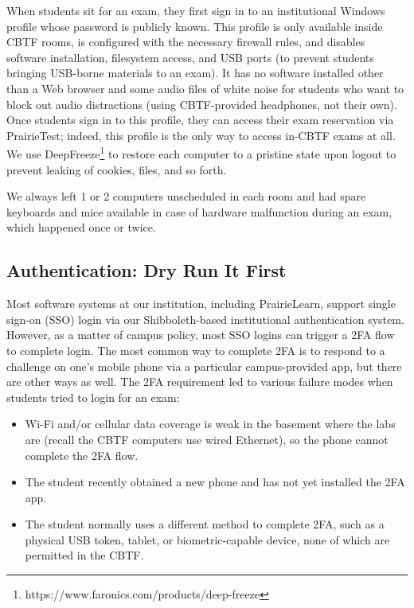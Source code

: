 When students sit for an exam, they first sign in to
an institutional Windows profile whose
password is publicly known.
This profile is only available inside CBTF rooms, is configured with  the
necessary firewall rules, and disables
software installation, filesystem access, and USB ports
(to prevent students bringing USB-borne materials
to an exam).  It has no software installed other than a Web
browser and some audio files of white noise for students
who want to block out audio distractions (using CBTF-provided
headphones, not their own).
Once students sign in to this profile, they can access their
exam reservation via PrairieTest; indeed, this profile 
is the only way to access in-CBTF exams at all.
We use DeepFreeze\footnote{https://www.faronics.com/products/deep-freeze}
to restore each computer to a pristine state upon logout to prevent
leaking of cookies, files, and so forth.

We always left 1 or 2 computers unscheduled in
each room and had spare keyboards and mice available
in case of hardware malfunction during an exam, which
happened once or twice.


\subsection{Authentication: Dry Run It First}

Most software systems at our institution, including PrairieLearn, support
single sign-on (SSO) login via our Shibboleth-based institutional authentication
system.
However, as a matter of campus policy, most
SSO logins can trigger a 2FA flow
to complete login.
The most common way to complete 2FA is to respond to a challenge on one's
mobile phone via a particular campus-provided app, but there are
other ways as well.  The 2FA requirement led to
various failure modes when students tried to login for an exam:

\begin{itemize}

\item Wi-Fi and/or cellular data coverage is weak in the basement where
  the labs are (recall the CBTF computers use wired Ethernet), so the phone
  cannot complete the 2FA flow.
\item The student recently obtained a new phone and has not yet
  installed the 2FA app.
\item The student normally uses a different method to complete 2FA,
  such as a physical USB token, tablet, or biometric-capable device,
  none of which are permitted in the CBTF.

\end{itemize}

